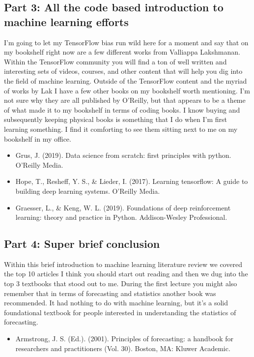 \documentclass{article}
\begin{document}
\subsection{Part 3: All the code based introduction to machine learning efforts}
I’m going to let my TensorFlow bias run wild here for a moment and say that on my bookshelf right now are a few different works from Valliappa Lakshmanan. Within the TensorFlow community you will find a ton of well written and interesting sets of videos, courses, and other content that will help you dig into the field of machine learning. Outside of the TensorFlow content and the myriad of works by Lak I have a few other books on my bookshelf worth mentioning. I’m not sure why they are all published by O’Reilly, but that appears to be a theme of what made it to my bookshelf in terms of coding books. I know buying and subsequently keeping physical books is something that I do when I’m first learning something. I find it comforting to see them sitting next to me on my bookshelf in my office. 

\begin{itemize}
\item Grus, J. (2019). Data science from scratch: first principles with python. O'Reilly Media. \cite{grus2019data}
\item Hope, T., Resheff, Y. S., \& Lieder, I. (2017). Learning tensorflow: A guide to building deep learning systems. O'Reilly Media. \cite{hope2017learning} 
\item Graesser, L., \& Keng, W. L. (2019). Foundations of deep reinforcement learning: theory and practice in Python. Addison-Wesley Professional. \cite{graesser2019foundations}
\end{itemize}
\subsection{Part 4: Super brief conclusion}
Within this brief introduction to machine learning literature review we covered the top 10 articles I think you should start out reading and then we dug into the top 3 textbooks that stood out to me. During the first lecture you might also remember that in terms of forecasting and statistics another book was recommended. It had nothing to do with machine learning, but it's a solid foundational textbook for people interested in understanding the statistics of forecasting. 

\begin{itemize}
\item Armstrong, J. S. (Ed.). (2001). Principles of forecasting: a handbook for researchers and practitioners (Vol. 30). Boston, MA: Kluwer Academic. \cite{armstrong2001principles}
\end{itemize}
\end{document}
